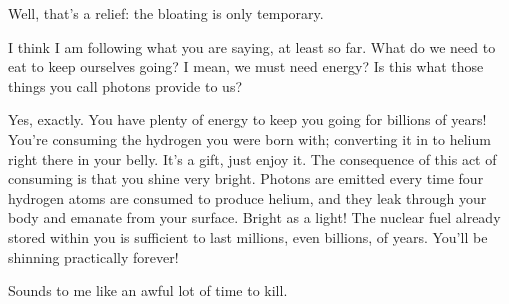 \documentclass[main.tex]{subfiles}
\begin{document}

\par \Sterope Well, that's a relief: the bloating is only temporary.

\par \Alcyone I think I am following what you are saying, at least so far.  What do we need to eat to keep ourselves going?  I mean, we must need energy?  Is this what those things you call photons provide to us?

\par \Maia Yes, exactly.  You have plenty of energy to keep you going for billions of years!  You're consuming the hydrogen you were born with; converting it in to helium right there in your belly.  It's a gift, just enjoy it.  The consequence of this act of consuming is that you shine very bright.  Photons are emitted every time four hydrogen atoms are consumed to produce helium, and they leak through your body and emanate from your surface.  Bright as a light!  The nuclear fuel already stored within you is sufficient to last millions, even billions, of years.  You'll be shinning practically forever!

\par \Celaeno Sounds to me like an awful lot of time to kill.
\end{document}
